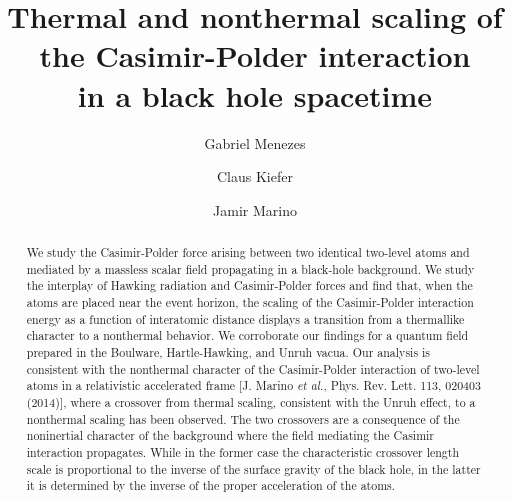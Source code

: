 \documentclass[twocolumn,prd,aps,showpacs,amsmath,amssymb]{revtex4-1}
\begin{document}
\title{Thermal and nonthermal scaling of the Casimir-Polder interaction\\ 
in a black hole spacetime}
%
\author{Gabriel Menezes}

\author{Claus Kiefer}


\author{Jamir Marino}


%

\begin{abstract}
We study the Casimir-Polder force arising between two identical
two-level atoms and mediated by a massless scalar field propagating in
a black-hole background.  We study the interplay of  Hawking radiation
and  Casimir-Polder forces and find that, when the atoms are placed
near the event horizon, the scaling of the Casimir-Polder interaction
energy as a function of interatomic distance displays a transition
from a thermallike character  to a nonthermal behavior. We
corroborate our findings for a quantum field  prepared in the
Boulware, Hartle-Hawking, and Unruh vacua.  
%
Our analysis is consistent with the nonthermal character of the
Casimir-Polder interaction of two-level atoms in a relativistic
accelerated frame [J. Marino \emph{et al.},  Phys. Rev. Lett. 113,
020403 (2014)], where a crossover from thermal scaling, consistent
with the Unruh effect, to a nonthermal scaling has been observed. 
The two crossovers are a consequence  of the noninertial character of
the  background where the field mediating the Casimir interaction
propagates. 
%
While in the former case the characteristic crossover length scale is
proportional to the inverse of the surface gravity of the black hole,
in the latter it is determined by the inverse of the proper
acceleration of the atoms. 

\end{abstract}


\maketitle
\end{document}
